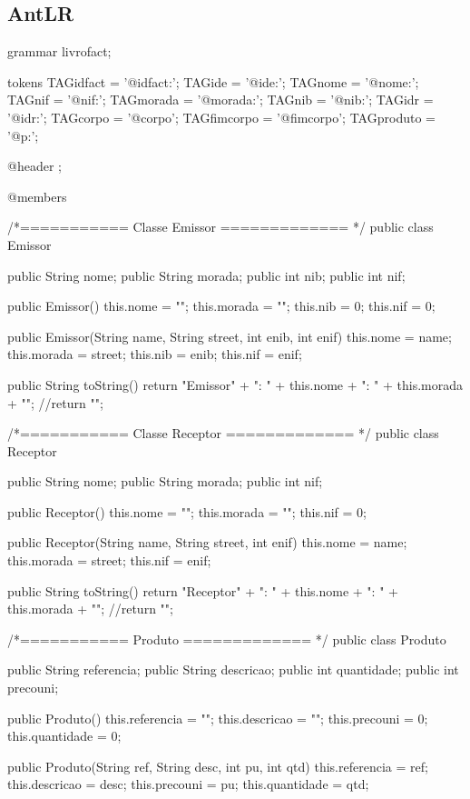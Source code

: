 \documentclass[11pt,a4paper]{article}
\begin{document}
\subsection{AntLR}
\begin{code_txt}
 grammar livrofact;

tokens{
	TAGidfact = '@idfact:';
	TAGide = '@ide:';
	TAGnome = '@nome:';
	TAGnif = '@nif:';
	TAGmorada = '@morada:';
	TAGnib = '@nib:';
	TAGidr = '@idr:';
	TAGcorpo = '@corpo';
	TAGfimcorpo = '@fimcorpo';
	TAGproduto = '@p:';
}

@header{
	;
}

@members{

/*===========  Classe Emissor ============= */
public class Emissor{

	public String nome;
	public String morada;
	public int nib;
	public int nif;
	
	public Emissor(){
		this.nome = "";
		this.morada = "";
		this.nib = 0;
		this.nif = 0;
	}
	
	public Emissor(String name, String street, int enib, int enif){
		this.nome = name;
		this.morada = street;
		this.nib = enib;
		this.nif = enif;
	}
	
	public String toString(){
		return "\nDados Emissor" + "\nNome: " + this.nome + "\nMorada: " + this.morada + "\n";
		//return "\nEmissor\n";
	}

}

/*===========  Classe Receptor ============= */
public class Receptor{

	public String nome;
	public String morada;
	public int nif;
	
	public Receptor(){
		this.nome = "";
		this.morada = "";
		this.nif = 0;
	}
	
	public Receptor(String name, String street, int enif){
		this.nome = name;
		this.morada = street;
		this.nif = enif;
	}
	
	public String toString(){
		return "\nDados Receptor" + "\nNome: " + this.nome + "\nMorada: " + this.morada + "\n";
		//return "\nReceptor\n";
	}

}

/*===========  Produto ============= */
public class Produto{
	public String referencia;
	public String descricao;
	public int quantidade;
	public int precouni;
	
	public Produto(){
		this.referencia = "";
		this.descricao = "";
		this.precouni = 0;
		this.quantidade = 0;
	}
	
	public Produto(String ref, String desc, int pu, int qtd){
		this.referencia = ref;
		this.descricao = desc;
		this.precouni = pu;
		this.quantidade = qtd;
	}
	
}}
\end{code_txt}
\end{document}
